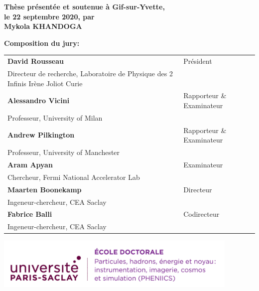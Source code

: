 \begin{titlingpage}
\textbf{Thèse présentée et soutenue à Gif-sur-Yvette, \\le 22 septembre 2020, par}\\
\bigskip
\Large {\color{Prune} \textbf{Mykola KHANDOGA}}


\vspace{\fill} %

\flushleft \small \textbf{Composition du jury:}

\bigskip

\scriptsize
\begin{tabular}{|p{8cm}l}
\arrayrulecolor{Prune}
\textbf{David Rousseau} &   Président\\ 
Directeur de recherche, Laboratoire de Physique des 2 Infinis Irène Joliot Curie & \\
\textbf{Alessandro Vicini} &  Rapporteur \& Examinateur \\ 
Professeur, University of Milan   &   \\ 
\textbf{Andrew Pilkington} &  Rapporteur \& Examinateur \\ 
Professeur, University of Manchester  &   \\ 
\textbf{Aram Apyan} &  Examinateur \\ 
Chercheur, Fermi National Accelerator Lab   &   \\ 
\textbf{Maarten Boonekamp} &  Directeur\\ 
Ingeneur-chercheur, CEA Saclay   &   \\ 
\textbf{Fabrice Balli} &  Codirecteur \\ 
Ingeneur-chercheur, CEA Saclay   &   \\ 

\end{tabular} 

\end{titlingpage}
\ifthispageodd{\newpage\thispagestyle{empty}\null\newpage}{}
\thispagestyle{empty}
\selectfont

\lhead{}
\rhead{}
\rfoot{}
\cfoot{}
\lfoot{}

\noindent 
\includegraphics[height=2.45cm]{EDpic}
\vspace{1cm}

